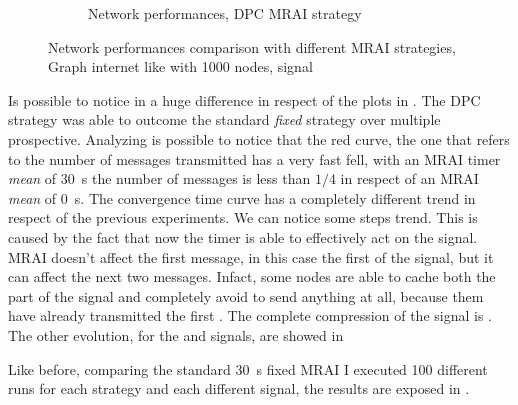 \begin{figure}[h]
\begin{subfigure}[b]{0.45\textwidth}
		 \caption{Network performances, \ac{DPC} \ac{MRAI} strategy}
         \label{fig:internet_like_1000_dpc_AWA}
     \end{subfigure}
	 \caption{Network performances comparison with different \ac{MRAI} strategies,
		Graph internet like with \num{1000} nodes, signal }
        \label{fig:internt_like_1000_evolution_AWA}
\end{figure}

Is possible to notice in  a huge difference
in respect of the plots in .
The \ac{DPC} strategy was able to outcome the standard \textit{fixed} strategy
over multiple prospective.
Analyzing  is possible to notice that
the red curve, the one that refers to the number of messages transmitted has
a very fast fell, with an \ac{MRAI} timer \textit{mean} of \SI{30}{\second}
the number of messages is less than $1/4$ in respect of an \ac{MRAI} \textit{mean}
of \SI{0}{\second}.
The convergence time curve has a completely different trend in respect of the
previous experiments.
We can notice some steps trend.
This is caused by the fact that now the timer is able to effectively act on the signal.
\ac{MRAI} doesn't affect the first message, in this case the first  of the
signal, but it can affect the next two messages.
Infact, some nodes are able to cache both the  part of the signal and
completely avoid to send anything at all, because them have already transmitted
the first .
The complete compression of the signal  is .
The other evolution, for the  and  signals, are showed in 

Like before, comparing the standard \SI{30}{\second} fixed \ac{MRAI} I executed
\num{100} different runs for each strategy and each different signal, the results
are exposed in .

